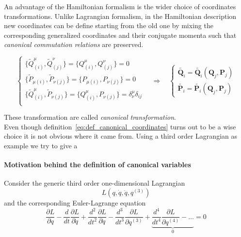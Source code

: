 An advantage of the Hamiltonian formalism is the wider choice of coordinates
transformations. Unlike Lagrangian formalism, in the Hamiltonian description new
coordinates can be define starting from the old one by mixing the corresponding
generalized coordinates and their conjugate momenta such that \emph{canonical
commutation relations} are preserved.

\begin{equation} \label{eq:canonical_transformation}
  \begin{cases}
    \{\tilde{Q}^{\mu}_{(i)}, \tilde{Q}^{\nu}_{(j)}\} =
    \{Q^{\mu}_{(i)}, Q^{\nu}_{(j)}\} = 0 \\
    \{\tilde{P}_{\mu(i)}, \tilde{P}_{\nu(j)}\} =
    \{P_{\mu(i)}, P_{\nu(j)}\} = 0 \\
    \{\tilde{Q}^{\mu}_{(i)}, \tilde{P}_{\nu(j)}\} =
    \{Q^{\mu}_{(i)}, P_{\nu(j)}\} = \delta^{\mu}_{\nu} \delta_{ij}\\
  \end{cases}
  \quad \Rightarrow \quad
  \begin{cases}
    \tilde{\bm{Q}_i} = \tilde{\bm{Q}_i}(\bm{Q}_j, \bm{P}_j) \\
    \tilde{\bm{P}_i} = \tilde{\bm{P}_i}(\bm{Q}_j, \bm{P}_j)
  \end{cases}
\end{equation}

These transformation are called \emph{canonical transformation}.\\

Even though definition~\eqref{eq:def_canonical_coordinates} turns out to be a
wise choice it is not obvious where it came from. Using a third order
Lagrangian as example we try to give a
\paragraph{Motivation behind the definition of canonical variables}
Consider the generic third order one-dimensional Lagrangian
\begin{equation*}
  L\left( q, \dot{q}, \ddot{q}, q^{(3)} \right)
\end{equation*}
and the corresponding Euler-Lagrange equation
\begin{equation} \label{eq:third_order_euler_lagrangian}
  \frac{\partial L}{\partial q} -
  \frac{d}{dt}\frac{\partial L}{\partial \dot{q}} +
  \frac{d^2}{dt^2}\frac{\partial L}{\partial \ddot{q}} -
  \frac{d^3}{dt^3}\frac{\partial L}{\partial q^{(3)}} +
  \underbrace{
  \frac{d^4}{dt^4}\frac{\partial L}{\partial q^{(4)}} - \ldots }_0 = 0
\end{equation}

